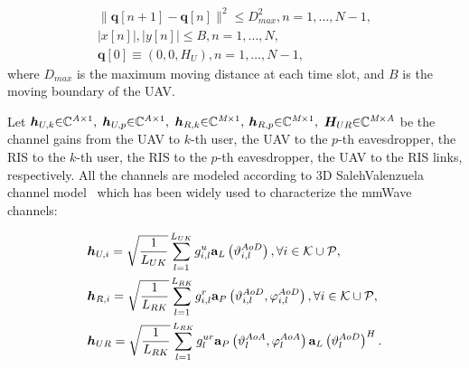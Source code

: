\documentclass[12pt, draftclsnofoot, onecolumn]{IEEEtran}
\begin{document}
\begin{subequations}\label{mobility-1}
	\begin{gather}
  \|\bm{q}[n+1]-\bm{q}[n] \|^2 \leq D_{max}^2 , n=1, \ldots, N-1,\\
  \left\lvert x[n] \right\rvert ,\left\lvert y[n] \right\rvert  \leq B , n=1, \ldots, N,\\
  \bm{q}[0] \equiv (0,0,H_{U}), n=1, \ldots, N-1,
	\end{gather}
\end{subequations} 
where $D_{max}$ is the maximum moving distance at each time slot, and $B$ is the moving boundary of the UAV.

Let ${\bm{h}}_{U,k}\rm{\in} \mathbb{C}^{\emph{A}\times 1},$ $\bm{h}_{U,p} \rm{\in} \mathbb{C}^{\emph{A}\times 1},$ $ \bm{h}_{R,k} \rm{\in} \mathbb{C}^{\emph{M}\times 1},$ $\bm{h}_{R,p} \rm{\in} \mathbb{C}^{\emph{M}\times 1},$ 
$\bm{H}_{UR} \rm{\in} \mathbb{C}^{\emph{M}\times \emph{A}}$ be the channel gains from the UAV to $k$-th user, the UAV to the $p$-th eavesdropper, the RIS to the $k$-th user, the RIS to the $p$-th eavesdropper, the UAV to the RIS links, respectively. All the channels are modeled according to 3D SalehValenzuela channel model~\cite{mmwave-1} which has been widely used to characterize the mmWave channels:

\begin{subequations}\label{channel-1}
	\begin{align}
  &{\bm{h}}_{U,i}=\sqrt{\frac{1}{L_{UK}}} \sum_{l = 1}^{L_{UK}} g^{u}_{i,l}{\mathbf{a }}_{L}  \left(\vartheta_{i,l}^{AoD}\right),\forall i \in {\cal K}\cup {\cal P},\\
  &{\bm{h}}_{R,i}=\sqrt{\frac{1}{L_{RK}}} \sum_{l = 1}^{L_{RK}} g^{r}_{i,l}{\mathbf{a }}_{P}  \left(\vartheta_{i,l}^{AoD}, \varphi_{i,l}^{AoD}\right),\forall i \in {\cal K}\cup {\cal P},\\
  &{\bm{h}}_{UR}=\sqrt{\frac{1}{L_{RK}}} \sum_{l = 1}^{L_{RK}} g^{ur}_{l}{\mathbf{a }}_{P}  \left(\vartheta_{l}^{AoA},\varphi_{l}^{AoA}\right){\mathbf{a }}_{L}  \left(\vartheta_{l}^{AoD}\right)^H .
  \end{align}
\end{subequations}
\end{document}

